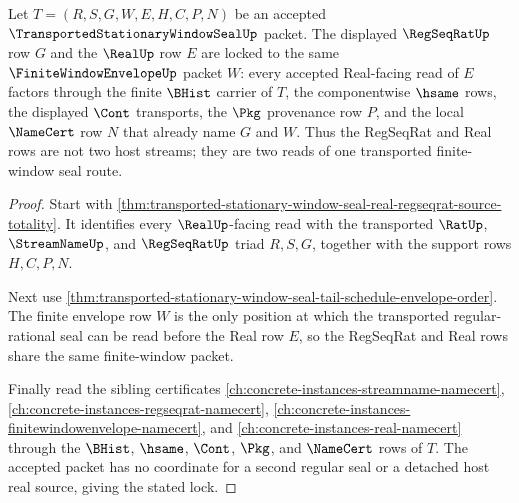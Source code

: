 \begin{theorem}
\label{thm:transported-stationary-window-seal-regseqrat-real-lock}
Let $T=(R,S,G,W,E,H,C,P,N)$ be an accepted $\TransportedStationaryWindowSealUp$ packet. The displayed $\RegSeqRatUp$ row $G$ and the $\RealUp$ row $E$ are locked to the same $\FiniteWindowEnvelopeUp$ packet $W$: every accepted Real-facing read of $E$ factors through the finite $\BHist$ carrier of $T$, the componentwise $\hsame$ rows, the displayed $\Cont$ transports, the $\Pkg$ provenance row $P$, and the local $\NameCert$ row $N$ that already name $G$ and $W$. Thus the RegSeqRat and Real rows are not two host streams; they are two reads of one transported finite-window seal route.
\end{theorem}
\begin{proof}
Start with \autoref{thm:transported-stationary-window-seal-real-regseqrat-source-totality}. It identifies every $\RealUp$-facing read with the transported $\RatUp$, $\StreamNameUp$, and $\RegSeqRatUp$ triad $R,S,G$, together with the support rows $H,C,P,N$.

Next use \autoref{thm:transported-stationary-window-seal-tail-schedule-envelope-order}. The finite envelope row $W$ is the only position at which the transported regular-rational seal can be read before the Real row $E$, so the RegSeqRat and Real rows share the same finite-window packet.

Finally read the sibling certificates \autoref{ch:concrete-instances-streamname-namecert}, \autoref{ch:concrete-instances-regseqrat-namecert}, \autoref{ch:concrete-instances-finitewindowenvelope-namecert}, and \autoref{ch:concrete-instances-real-namecert} through the $\BHist$, $\hsame$, $\Cont$, $\Pkg$, and $\NameCert$ rows of $T$. The accepted packet has no coordinate for a second regular seal or a detached host real source, giving the stated lock.
\end{proof}

